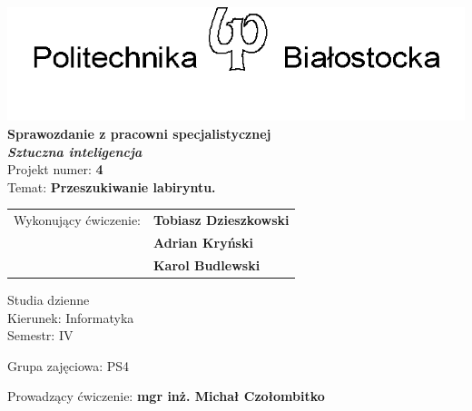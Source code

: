 \documentclass[12pt,a4paper]{article}
\newcommand{\numerzajec}{4}
\newcommand{\tematzajec}{Przeszukiwanie labiryntu.}
\begin{document}
	\thispagestyle{empty}
	\begin{center}
		\vspace*{1.6cm}
		\includegraphics[width=0.55\linewidth]{obrazki/pblogo.png}	\\
		\vspace{0.5cm}
		\large
		\textsf{\textbf{Sprawozdanie z pracowni specjalistycznej}} \\
		\vspace{0.5cm}
		\textsf{\textbf{\textit{Sztuczna inteligencja}}}	\\
		\vspace{1cm}
		\textsf{Projekt numer: \textbf{\numerzajec}}	\\
		\vspace{0.5cm}
		\textsf{Temat: \textbf{\tematzajec}}
	\end{center}

	\vspace{2cm}
	\begin{tabular}{rl}
        Wykonujący ćwiczenie: &\textbf{Tobiasz Dzieszkowski} \\
                              & \textbf{Adrian Kryński} \\
                              & \textbf{Karol Budlewski} \\
	\end{tabular}

	\vspace{3.5cm}	

	\begin{minipage}{0.45\linewidth}
		\large
		\begin{spacing}{1.5}
		Studia dzienne \\
		Kierunek: Informatyka \\
		Semestr: IV \\
		\end{spacing}
	\end{minipage}
	\begin{minipage}[t]{0.5\linewidth}
		\large
		\begin{spacing}{1.2}
		Grupa zajęciowa: PS4
		\end{spacing}
	\end{minipage}
	
	Prowadzący ćwiczenie: \textbf{mgr inż. Michał Czołombitko} \\
	
\end{document}
